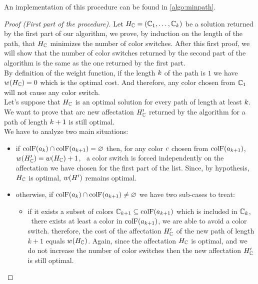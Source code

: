 An implementation of this procedure can be found in \cref{algo:minpath}.


\begin{proof}[Proof (First part of the procedure)]
  Let $H_{\mathbb{C}} = (\mathbb{C}_1,\ldots,\mathbb{C}_{k})$ be a solution returned by the first part of our algorithm, we prove, by induction on the length of the path, that $H_{\mathbb{C}}$ minimizes the number of color switches. After this first proof, we will show that the number of color switches returned by the second part of the algorithm is the same as the one returned by the first part. \\
  By definition of the weight function, if the length $k$ of the path is $1$ we have $w(H_{\mathbb{C}}) = 0$ which is the optimal cost. And therefore, any color chosen from $\mathbb{C}_1$ will not cause any color switch.\\
  Let's suppose that $H_{\mathbb{C}}$ is an optimal solution for every path of length at least $k$. We want to prove that arc new affectation $H_{\mathbb{C}}'$ returned by the algorithm for a path of length $k+1$ is still optimal. \\
  We have to analyze two main situations:

  \begin{itemize}
    \item if $\text{colF}(a_k) \cap \text{colF}(a_{k+1}) = \varnothing$ then, for any color $c$ chosen from $\text{colF}(a_{k+1})$, $w(H_{\mathbb{C}}') = w(H_{\mathbb{C}}) + 1$, \ie\ a color switch is forced independently on the affectation we have chosen for the first part of the list. Since, by hypothesis, $H_{\mathbb{C}}$ is optimal, $w(H')$ remains optimal.
    \item otherwise, if $\text{colF}(a_k) \cap \text{colF}(a_{k+1}) \neq \varnothing$ we have two sub-cases to treat:
          \begin{itemize}

            \item if it exists a subset of colors $\mathbb{C}_{k+1} \subseteq \text{colF}(a_{k+1})$ which is included in $\mathbb{C}_k$, \ie\ there exists at least a color in $\text{colF}(a_{k+1})$, we are able to avoid a color switch. therefore, the cost of the affectation $H_{\mathbb{C}}'$ of the new path of length $k+1$ equals $w(H_{\mathbb{C}})$. Again, since the affectation $H_{\mathbb{C}}$ is optimal, and we do not increase the number of color switches then the new affectation $H_{\mathbb{C}}'$ is still optimal.


\end{itemize}
\end{itemize}
\end{proof}
